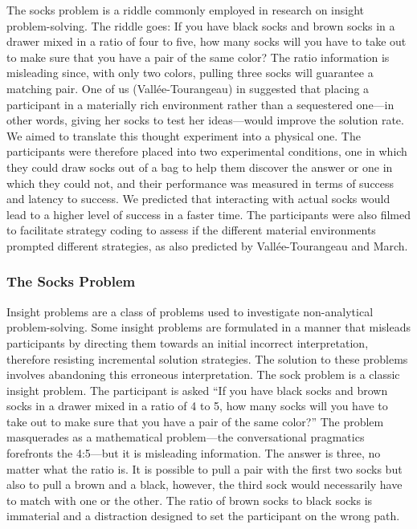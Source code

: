 \documentclass[twocolumn, serif, empirical, authordate]{jote-article}
\begin{document}
The socks problem is a riddle commonly employed in research on insight problem-solving. The riddle goes: If you have black socks and brown socks in a drawer mixed in a ratio of four to five, how many socks will you have to take out to make sure that you have a pair of the same color? The ratio information is misleading since, with only two colors, pulling three socks will guarantee a matching pair. One of us (Vallée-Tourangeau) in \textcite{Vallée-Tourangeau2020} suggested that placing a participant in a materially rich environment rather than a sequestered one---in other words, giving her socks to test her ideas---would improve the solution rate. We aimed to translate this thought experiment into a physical one. The participants were therefore placed into two experimental conditions, one in which they could draw socks out of a bag to help them discover the answer or one in which they could not, and their performance was measured in terms of success and latency to success. We predicted that interacting with actual socks would lead to a higher level of success in a faster time. The participants were also filmed to facilitate strategy coding to assess if the different material environments prompted different strategies, as also predicted by Vallée-Tourangeau and March.





\subsubsection{The Socks Problem}

Insight problems are a class of problems used to investigate non-analytical problem-solving. Some insight problems are formulated in a manner that misleads participants by directing them towards an initial incorrect interpretation, therefore resisting incremental solution strategies. The solution to these problems involves abandoning this erroneous interpretation. The sock problem is a classic insight problem.
The participant is asked ``If you have black socks and brown socks in a drawer mixed in a ratio of 4 to 5, how many socks will you have to take out to make sure that you have a pair of the same color?'' The problem masquerades as a mathematical problem---the conversational pragmatics forefronts the 4:5---but it is misleading information. The answer is three, no matter what the ratio is. It is possible to pull a pair with the first two socks but also to pull a brown and a black, however, the third sock would necessarily have to match with one or the other. The ratio of brown socks to black socks is immaterial and a distraction designed to set the participant on the wrong path.
\end{document}
